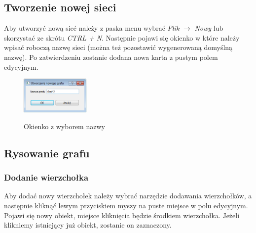 \subsection{Tworzenie nowej sieci}
Aby utworzyć nową sieć należy z paska menu wybrać \textit{Plik} $ \rightarrow $ \textit{Nowy} lub skorzystać ze skrótu \textit{CTRL + N}. Następnie pojawi się okienko w które należy wpisać roboczą nazwę sieci (można też pozostawić wygenerowaną domyślną nazwę). Po zatwierdzeniu zostanie dodana nowa karta z pustym polem edycyjnym.
\begin{figure}[H]
	\centering
	\includegraphics[width=0.3\textwidth]{./img/spec_zew02}
	\label{fig:nowyGrafMsgbox}
	\caption{Okienko z wyborem nazwy}
\end{figure}
\subsection{Rysowanie grafu}
\subsubsection{Dodanie wierzchołka}
Aby dodać nowy wierzchołek należy wybrać narzędzie dodawania wierzchołków, a następnie kliknąć lewym przyciskiem myszy na puste miejsce w polu edycyjnym. Pojawi się nowy obiekt, miejsce kliknięcia będzie środkiem wierzchołka. Jeżeli klikniemy istniejący już obiekt, zostanie on zaznaczony.
